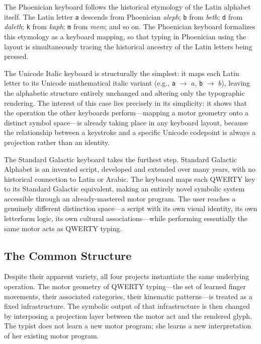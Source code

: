 \documentclass[12pt,a4paper]{article}
\theoremstyle{plain}
\theoremstyle{definition}
\theoremstyle{remark}
\begin{document}
The Phoenician keyboard follows the historical etymology of the Latin alphabet
itself. The Latin letter \texttt{a} descends from Phoenician \textit{aleph};
\texttt{b} from \textit{beth}; \texttt{d} from \textit{daleth}; \texttt{k}
from \textit{kaph}; \texttt{m} from \textit{mem}; and so on. The Phoenician
keyboard formalizes this etymology as a keyboard mapping, so that typing in
Phoenician using the layout is simultaneously tracing the historical ancestry
of the Latin letters being pressed.

The Unicode Italic keyboard is structurally the simplest: it maps each Latin
letter to its Unicode mathematical italic variant (e.g., \texttt{a}
$\to$ $\mathit{a}$, \texttt{b} $\to$ $\mathit{b}$), leaving the alphabetic
structure entirely unchanged and altering only the typographic rendering. The
interest of this case lies precisely in its simplicity: it shows that the
operation the other keyboards perform---mapping a motor geometry onto a distinct
symbol space---is already taking place in any keyboard layout, because the
relationship between a keystroke and a specific Unicode codepoint is always a
projection rather than an identity.

The Standard Galactic keyboard takes the furthest step. Standard Galactic
Alphabet is an invented script, developed and extended over many years, with no
historical connection to Latin or Arabic. The keyboard maps each QWERTY key to
its Standard Galactic equivalent, making an entirely novel symbolic system
accessible through an already-mastered motor program. The user reaches a
genuinely different distinction space---a script with its own visual identity,
its own letterform logic, its own cultural associations---while performing
essentially the same motor acts as QWERTY typing.

\subsection{The Common Structure}

Despite their apparent variety, all four projects instantiate the same
underlying operation. The motor geometry of QWERTY typing---the set of learned
finger movements, their associated categories, their kinematic patterns---is
treated as a fixed infrastructure. The symbolic output of that infrastructure
is then changed by interposing a projection layer between the motor act and
the rendered glyph. The typist does not learn a new motor program; she learns
a new interpretation of her existing motor program.
\end{document}
